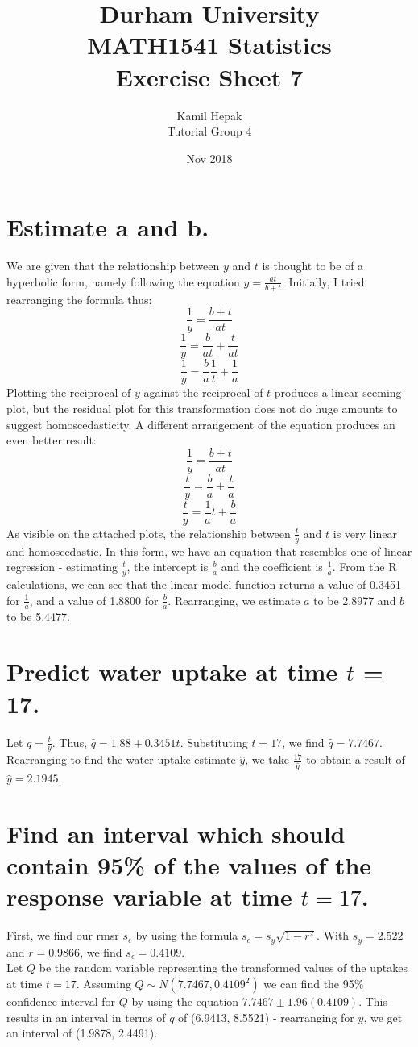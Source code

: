 \documentclass[]{article}
\title{Durham University\\
    MATH1541 Statistics \\
	Exercise Sheet 7}
\author{Kamil Hepak\\
        Tutorial Group 4}
\date{Nov 2018}
\begin{document}
\maketitle

\section{Estimate a and b.}
We are given that the relationship between $y$ and $t$ is thought to be of a hyperbolic form, namely following the equation $y = \frac{at}{b+t}$. Initially, I tried rearranging the formula thus:
$$\frac{1}{y}=\frac{b+t}{at}$$
$$\frac{1}{y}=\frac{b}{at}+\frac{t}{at}$$
$$\frac{1}{y}=\frac{b}{a}\frac{1}{t}+\frac{1}{a}$$
Plotting the reciprocal of $y$ against the reciprocal of $t$ produces a linear-seeming plot, but the residual plot for this transformation does not do huge amounts to suggest homoscedasticity. A different arrangement of the equation produces an even better result:
$$\frac{1}{y}=\frac{b+t}{at}$$
$$\frac{t}{y}=\frac{b}{a}+\frac{t}{a}$$
$$\frac{t}{y}=\frac{1}{a}t+\frac{b}{a}$$
As visible on the attached plots, the relationship between $\frac{t}{y}$ and $t$ is very linear and homoscedastic. In this form, we have an equation that resembles one of linear regression - estimating $\frac{t}{y}$, the intercept is $\frac{b}{a}$ and the coefficient is $\frac{1}{a}$.
From the R calculations, we can see that the linear model function returns a value of 0.3451 for $\frac{1}{a}$, and a value of 1.8800 for $\frac{b}{a}$. Rearranging, we estimate $a$ to be 2.8977 and $b$ to be 5.4477.

\section{Predict water uptake at time $t$ = 17.}
Let $q = \frac{t}{y}$. Thus, $\hat{q} = 1.88 + 0.3451t$. Substituting $t = 17$, we find $\hat{q} = 7.7467$. Rearranging to find the water uptake estimate $\hat{y}$, we take $\frac{17}{\hat{q}}$ to obtain a result of $\hat{y} = 2.1945$.

\section{Find an interval which should contain 95\% of the values of the response variable at time $t = 17$.}
First, we find our rmsr $s_{\epsilon}$ by using the formula $s_{\epsilon} = s_{y}\sqrt{1 - r^2}$. With $s_{y} = 2.522$ and $r = 0.9866$, we find $s_{\epsilon} = 0.4109$.
\\
Let $Q$ be the random variable representing the transformed values of the uptakes at time $t = 17$. Assuming $Q\sim N(7.7467, 0.4109^2)$ we can find the 95\% confidence interval for $Q$ by using the equation $7.7467 \pm 1.96(0.4109)$. This results in an interval in terms of $q$ of (6.9413, 8.5521) - rearranging for $y$, we get an interval of (1.9878, 2.4491).
\end{document}
